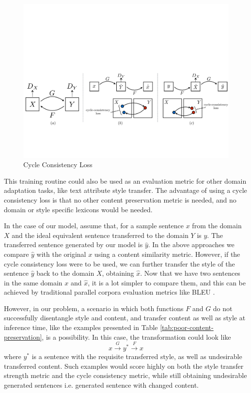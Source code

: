 \begin{figure}[ht]
	\centering
	\includegraphics[width=\textwidth]{images/cycle-consistency}
	\caption{\label{fig:cycle-consistency} Cycle Consistency Loss}
\end{figure}

This training routine could also be used as an evaluation metric for other domain adaptation tasks, like text attribute style transfer. The advantage of using a cycle consistency loss is that no other content preservation metric is needed, and no domain or style specific lexicons would be needed.

In the case of our model, assume that, for a sample sentence $x$ from the domain $X$ and the ideal equivalent sentence transferred to the domain $Y$ is $y$. The transferred sentence generated by our model is $\hat{y}$. In the above approaches we compare $\hat{y}$ with the original $x$ using a content similarity metric. However, if the cycle consistency loss were to be used, we can further transfer the style of the sentence $\hat{y}$ back to the domain $X$, obtaining $\hat{x}$. Now that we have two sentences in the same domain $x$ and $\hat{x}$, it is a lot simpler to compare them, and this can be achieved by traditional parallel corpora evaluation metrics like BLEU \citep{papineni2002bleu}.

However, in our problem, a scenario in which both functions $F$ and $G$ do not successfully disentangle style and content, and transfer content as well as style at inference time, like the examples presented in Table \ref{tab:poor-content-preservation}, is a possibility. In this case, the transformation could look like
\begin{equation*}
	x \xrightarrow{G} y^* \xrightarrow{F} x
\end{equation*}
where $y^*$ is a sentence with the requisite transferred style, as well as undesirable transferred content. Such examples would score highly on both the style transfer strength metric and the cycle consistency metric, while still obtaining undesirable generated sentences i.e. generated sentence with changed content.

